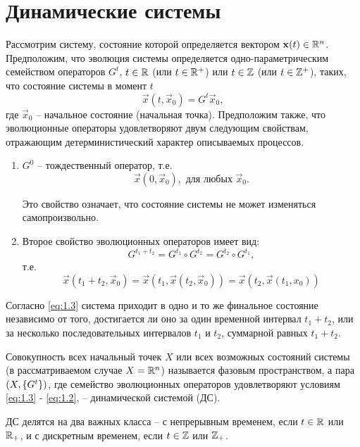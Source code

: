 \section{Динамические системы} %
Рассмотрим систему, состояние которой определяется вектором $\mathbf x (t) 
\in \mathbb{R}^n$. Предположим, что эволюция системы определяется одно-параметрическим семейством операторов $G^t$, $t\in\mathbb{R}$ (или $t\in\mathbb{R}^+$) или $t\in \mathbb{Z}$ (или $t\in\mathbb{Z}^+$), таких, что состояние системы в момент $t$
\begin{equation}
	\label{eq:1.1}
	\vec x(t,\vec x_0) = G^t \vec x_0,
\end{equation}
где $\vec x_0$ -- начальное состояние (начальная точка). Предположим также, что эволюционные операторы удовлетворяют двум следующим свойствам, отражающим детерминистический характер описываемых процессов.
\begin{enumerate}
	\item $G^0$ -- тождественный оператор, т.е.
	\begin{equation}
	\label{eq:1.2}
		\vec x(0, \vec x_0), \text{ для любых } \vec x_0.
	\end{equation}

Это свойство означает, что состояние системы не может изменяться самопроизвольно.

	\item  Второе свойство эволюционных операторов имеет вид:
	\begin{equation}
		\label{eq:1.3}
		G^{t_1+t_2}= G^{t_1} \circ G^{t_2}= G^{t_2} \circ G^{t_1},
	\end{equation}
	т.е.
	\begin{equation}
		\label{eq:1.4}
		\vec x (t_1+t_2, \vec x_0) = \vec x (t_1, \vec x(t_2, \vec x_0)) = \vec x (t_2, \vec x (t_1,x_0))
	\end{equation}
\end{enumerate}
 
 Согласно \eqref{eq:1.3} система приходит в одно и то же финальное состояние независимо от того, достигается ли оно за один временной интервал $t_1+t_2$, или за несколько последовательных интервалов $t_1$ и $t_2$, суммарной равных $t_1+t_2$.

 Совокупность всех начальный точек $X$ или всех возможных состояний системы (в рассматриваемом случае $X= \mathbb{R}^n$) называется фазовым пространством, а пара $\qty(X,\{G^t\})$, где семейство эволюционных операторов удовлетворяют условиям \eqref{eq:1.3} - \eqref{eq:1.2}, -- динамической системой (ДС).

 ДС делятся на два важных класса -- с непрерывным временем, если $t\in \mathbb{R}$ или $\mathbb{R}_+$,  и с дискретным временем, если $t\in \mathbb{Z}$ или $\mathbb{Z}_+$.

